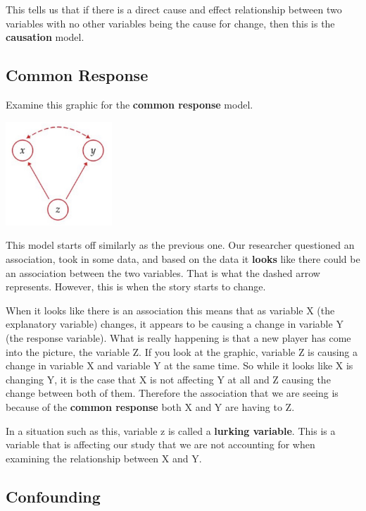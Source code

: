 \documentclass[
  letterpaper,
  DIV=11,
  numbers=noendperiod]{scrreprt}
\begin{document}
This tells us that if there is a direct cause and effect relationship
between two variables with no other variables being the cause for
change, then this is the \textbf{causation} model.

\subsection*{Common Response}\label{common-response}

Examine this graphic for the \textbf{common response} model.

\includegraphics[width=0.3\textwidth,height=\textheight]{./images/IDV_2.jpg}

This model starts off similarly as the previous one. Our researcher
questioned an association, took in some data, and based on the data it
\textbf{looks} like there could be an association between the two
variables. That is what the dashed arrow represents. However, this is
when the story starts to change.

When it looks like there is an association this means that as variable X
(the explanatory variable) changes, it appears to be causing a change in
variable Y (the response variable). What is really happening is that a
new player has come into the picture, the variable Z. If you look at the
graphic, variable Z is causing a change in variable X and variable Y at
the same time. So while it looks like X is changing Y, it is the case
that X is not affecting Y at all and Z causing the change between both
of them. Therefore the association that we are seeing is because of the
\textbf{common response} both X and Y are having to Z.

In a situation such as this, variable z is called a \textbf{lurking
variable}. This is a variable that is affecting our study that we are
not accounting for when examining the relationship between X and Y.

\subsection*{Confounding}\label{confounding}
\end{document}
